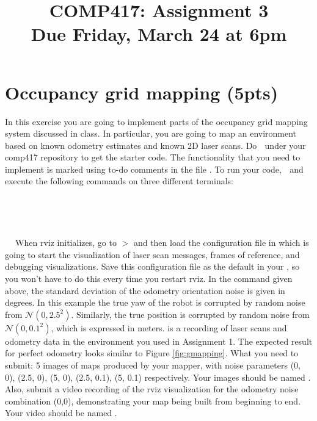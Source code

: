 \documentclass[a4paper,10pt]{article}
\title{COMP417: Assignment 3\\Due Friday, March 24  at 6pm}
\author{}
\begin{document}
\maketitle


\section{Occupancy grid mapping (5pts)}
In this exercise you are going to implement parts of the occupancy grid mapping system discussed in class. In particular, you are going to map an environment 
based on known odometry estimates and known 2D laser scans. Do  $\;$  under your comp417 repository to get the starter code. The functionality 
that you need to implement is marked using to-do comments in the file . To run your code, 
 $\;$  and execute the following commands on three different terminals: 
\newline

   $\;$  $\;$ 
  
   $\;$  $\;$  $\;$  $\;$ 
  
   $\;$  $\;$  
\newline
\newline
\noindent When rviz initializes, go to  $>$  and then load the configuration file in 
which is going to start the visualization of laser scan messages, frames of reference, and debugging visualizations. Save this configuration file as the default
in your , so you won't have to do this every time you restart rviz. In the  command given above, the standard deviation of 
the odometry orientation noise is given in degrees. In this example the true yaw of the robot is corrupted by random noise from $\mathcal{N}(0, 2.5^2)$. Similarly, the true position 
is corrupted by random noise from $\mathcal{N}(0, 0.1^2)$, which is expressed in meters.  is a recording of laser scans and odometry data in the environment 
you used in Assignment 1. The expected result for perfect odometry looks similar to Figure \ref{fig:gmapping}. 
\newline
\newline
\newline
\noindent What you need to submit: 5 images of maps produced by your mapper, with noise parameters (0, 0), (2.5, 0), (5, 0), (2.5, 0.1), (5, 0.1) respectively. 
Your images should be named . Also, submit a video recording of the rviz visualization for the odometry noise combination (0,0),
demonstrating your map being built from beginning to end. Your video should be named . 
\end{document}
